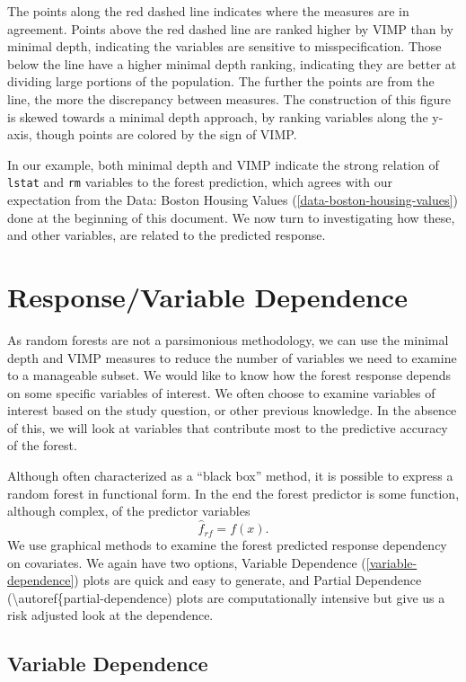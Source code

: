 \documentclass[article]{jss}
\begin{document}
The points along the red dashed line indicates where the measures are in
agreement. Points above the red dashed line are ranked higher by VIMP
than by minimal depth, indicating the variables are sensitive to
misspecification. Those below the line have a higher minimal depth
ranking, indicating they are better at dividing large portions of the
population. The further the points are from the line, the more the
discrepancy between measures. The construction of this figure is skewed
towards a minimal depth approach, by ranking variables along the y-axis,
though points are colored by the sign of VIMP.

In our example, both minimal depth and VIMP indicate the strong relation
of \texttt{lstat} and \texttt{rm} variables to the forest prediction,
which agrees with our expectation from the Data: Boston Housing Values
(\autoref{data-boston-housing-values}) done at the beginning of this
document. We now turn to investigating how these, and other variables,
are related to the predicted response.

\section{Response/Variable
Dependence}\label{responsevariable-dependence}

As random forests are not a parsimonious methodology, we can use the
minimal depth and VIMP measures to reduce the number of variables we
need to examine to a manageable subset. We would like to know how the
forest response depends on some specific variables of interest. We often
choose to examine variables of interest based on the study question, or
other previous knowledge. In the absence of this, we will look at
variables that contribute most to the predictive accuracy of the forest.

Although often characterized as a ``black box'' method, it is possible
to express a random forest in functional form. In the end the forest
predictor is some function, although complex, of the predictor variables
\[\hat{f}_{rf} = f(x).\] We use graphical methods to examine the forest
predicted response dependency on covariates. We again have two options,
Variable Dependence (\autoref{variable-dependence}) plots are quick and
easy to generate, and Partial Dependence
(\textbackslash{}autoref\{partial-dependence) plots are computationally
intensive but give us a risk adjusted look at the dependence.

\subsection{Variable Dependence}\label{variable-dependence}
\end{document}
